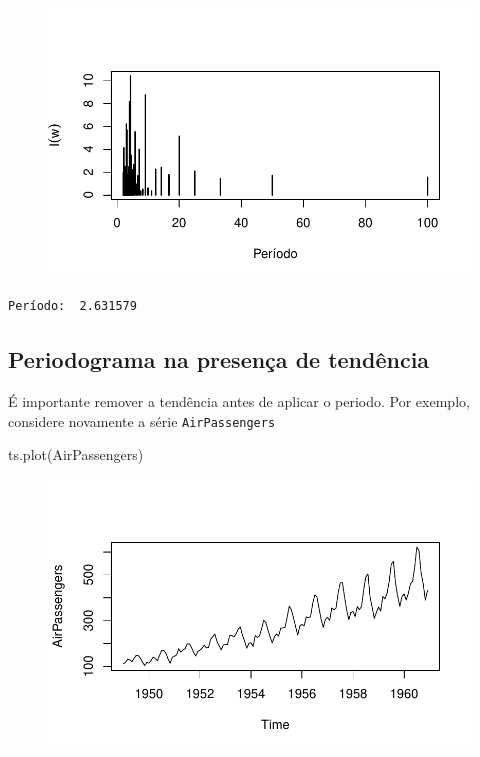 \documentclass[
  letterpaper,
  DIV=11,
  numbers=noendperiod]{scrreprt}
\newenvironment{Shaded}{\begin{snugshade}}{\end{snugshade}}
\newcommand{\FunctionTok}[1]{\textcolor[rgb]{0.28,0.35,0.67}{#1}}
\newcommand{\NormalTok}[1]{\textcolor[rgb]{0.00,0.23,0.31}{#1}}
\begin{document}
\begin{figure}[H]

{\centering \includegraphics{ferramentas_files/figure-pdf/unnamed-chunk-12-1.pdf}

}

\end{figure}

\begin{verbatim}
Período:  2.631579 
\end{verbatim}

\hypertarget{periodograma-na-presenuxe7a-de-tenduxeancia}{%
\subsection{Periodograma na presença de
tendência}\label{periodograma-na-presenuxe7a-de-tenduxeancia}}

É importante remover a tendência antes de aplicar o periodo. Por
exemplo, considere novamente a série \texttt{AirPassengers}

\begin{Shaded}
\begin{Highlighting}[]
\FunctionTok{ts.plot}\NormalTok{(AirPassengers)}
\end{Highlighting}
\end{Shaded}

\begin{figure}[H]

{\centering \includegraphics{ferramentas_files/figure-pdf/unnamed-chunk-13-1.pdf}

}

\end{figure}
\end{document}
